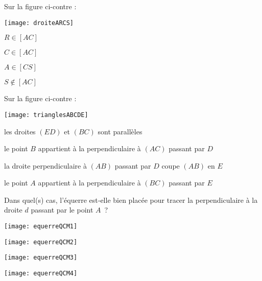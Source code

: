 \begin{QCM}
  \begin{GroupeQCM}
    \begin{exercice}
     Sur la figure ci-contre : \vspace{-2em} \begin{center} \texttt{[image: droiteARCS]} \end{center} \vspace{-1em}
      \begin{ChoixQCM}{4}
      \item $R \in [AC]$
      \item $C \in [AC]$
      \item $A \in [CS]$
      \item $S \notin [AC]$
      \end{ChoixQCM}
\begin{corrige}
   \end{corrige}
    \end{exercice}
 
    
    \begin{exercice}
     Sur la figure ci-contre : \vspace{-2em}\begin{center}\texttt{[image: trianglesABCDE]}\end{center}\vspace{-1em}
      \begin{ChoixQCM}{4}
      \item les droites $(ED)$ et $(BC)$ sont parallèles
      \item le point $B$ appartient à la perpendiculaire à $(AC)$ passant par $D$
      \item la droite perpendiculaire à $(AB)$ passant par $D$ coupe $(AB)$ en $E$
      \item le point $A$ appartient à la  perpendiculaire à $(BC)$ passant par $E$
      \end{ChoixQCM}
\begin{corrige}
   \end{corrige}
    \end{exercice}


    \begin{exercice}
     Dans quel(s) cas, l'équerre est‑elle bien placée pour tracer la perpendiculaire à la droite $d$ passant par le point $A$ ?
      \begin{ChoixQCM}{4}
      \item \texttt{[image: equerreQCM1]}
      \item \texttt{[image: equerreQCM2]}
      \item \texttt{[image: equerreQCM3]}
      \item \texttt{[image: equerreQCM4]}
      \end{ChoixQCM}
\begin{corrige}
   \end{corrige}
    \end{exercice}

   \end{GroupeQCM}  
 \end{QCM}  
 
